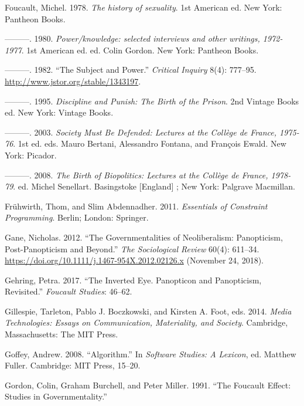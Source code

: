 \documentclass[12pt,twoside]{report}
\begin{document}
\leavevmode\hypertarget{ref-Foucault1978}{}%
Foucault, Michel. 1978. \emph{The history of sexuality}. 1st American ed. New York: Pantheon Books.

\leavevmode\hypertarget{ref-Foucault1980}{}%
---------. 1980. \emph{Power/knowledge: selected interviews and other writings, 1972-1977}. 1st American ed. ed. Colin Gordon. New York: Pantheon Books.

\leavevmode\hypertarget{ref-Foucault1982}{}%
---------. 1982. ``The Subject and Power.'' \emph{Critical Inquiry} 8(4): 777--95. \url{http://www.jstor.org/stable/1343197}.

\leavevmode\hypertarget{ref-Foucault1995}{}%
---------. 1995. \emph{Discipline and Punish: The Birth of the Prison}. 2nd Vintage Books ed. New York: Vintage Books.

\leavevmode\hypertarget{ref-Foucault2003}{}%
---------. 2003. \emph{Society Must Be Defended: Lectures at the Collège de France, 1975-76}. 1st ed. eds. Mauro Bertani, Alessandro Fontana, and François Ewald. New York: Picador.

\leavevmode\hypertarget{ref-Foucault2008}{}%
---------. 2008. \emph{The Birth of Biopolitics: Lectures at the Collège de France, 1978-79}. ed. Michel Senellart. Basingstoke {[}England{]} ; New York: Palgrave Macmillan.

\leavevmode\hypertarget{ref-Fruxfchwirth2011}{}%
Frühwirth, Thom, and Slim Abdennadher. 2011. \emph{Essentials of Constraint Programming}. Berlin; London: Springer.

\leavevmode\hypertarget{ref-Gane2012}{}%
Gane, Nicholas. 2012. ``The Governmentalities of Neoliberalism: Panopticism, Post-Panopticism and Beyond.'' \emph{The Sociological Review} 60(4): 611--34. \url{https://doi.org/10.1111/j.1467-954X.2012.02126.x} (November 24, 2018).

\leavevmode\hypertarget{ref-Gehring2017}{}%
Gehring, Petra. 2017. ``The Inverted Eye. Panopticon and Panopticism, Revisited.'' \emph{Foucault Studies}: 46--62.

\leavevmode\hypertarget{ref-Gillespie2014}{}%
Gillespie, Tarleton, Pablo J. Boczkowski, and Kirsten A. Foot, eds. 2014. \emph{Media Technologies: Essays on Communication, Materiality, and Society}. Cambridge, Massachusetts: The MIT Press.

\leavevmode\hypertarget{ref-Goffey2008}{}%
Goffey, Andrew. 2008. ``Algorithm.'' In \emph{Software Studies: A Lexicon}, ed. Matthew Fuller. Cambridge: MIT Press, 15--20.

\leavevmode\hypertarget{ref-Gordon1991}{}%
Gordon, Colin, Graham Burchell, and Peter Miller. 1991. ``The Foucault Effect: Studies in Governmentality.''
\end{document}
